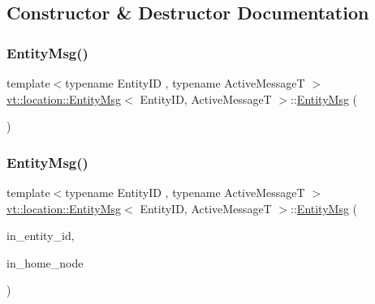 \subsection{Constructor \& Destructor Documentation}
\mbox{\label{structvt_1_1location_1_1_entity_msg_a962b4711acd88b3be14cde800dcfe967}} 
\subsubsection{\texorpdfstring{Entity\+Msg()}{EntityMsg()}\hspace{0.1cm}{\footnotesize\ttfamily [1/2]}}
{\footnotesize\ttfamily template$<$typename Entity\+ID , typename Active\+MessageT $>$ \\
\hyperlink{structvt_1_1location_1_1_entity_msg}{vt\+::location\+::\+Entity\+Msg}$<$ Entity\+ID, Active\+MessageT $>$\+::\hyperlink{structvt_1_1location_1_1_entity_msg}{Entity\+Msg} (\begin{DoxyParamCaption}{ }\end{DoxyParamCaption})\hspace{0.3cm}{\ttfamily [default]}}

\mbox{\label{structvt_1_1location_1_1_entity_msg_a20a8679b67ce88ab88d2fd915dae6d23}} 
\subsubsection{\texorpdfstring{Entity\+Msg()}{EntityMsg()}\hspace{0.1cm}{\footnotesize\ttfamily [2/2]}}
{\footnotesize\ttfamily template$<$typename Entity\+ID , typename Active\+MessageT $>$ \\
\hyperlink{structvt_1_1location_1_1_entity_msg}{vt\+::location\+::\+Entity\+Msg}$<$ Entity\+ID, Active\+MessageT $>$\+::\hyperlink{structvt_1_1location_1_1_entity_msg}{Entity\+Msg} (\begin{DoxyParamCaption}\item[{Entity\+ID const \&}]{in\+\_\+entity\+\_\+id,  }\item[{\hyperlink{namespacevt_a866da9d0efc19c0a1ce79e9e492f47e2}{Node\+Type} const \&}]{in\+\_\+home\+\_\+node }\end{DoxyParamCaption})\hspace{0.3cm}{\ttfamily [inline]}}




